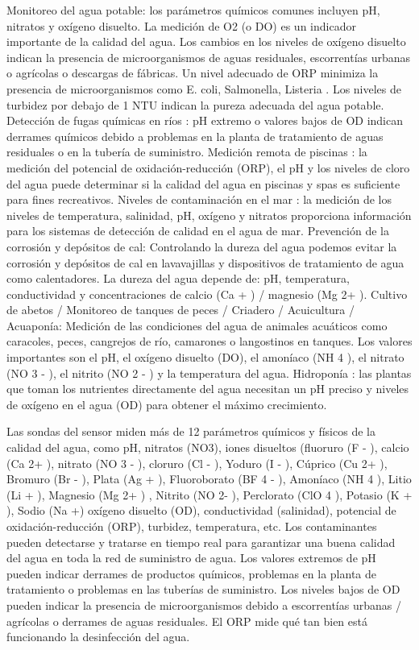 Monitoreo del agua potable: los parámetros químicos comunes incluyen pH, nitratos y oxígeno disuelto. 
La medición de O2 (o DO) es un indicador importante de la calidad del agua. 
Los cambios en los niveles de oxígeno disuelto indican la presencia de microorganismos de aguas residuales, escorrentías urbanas o agrícolas o descargas de fábricas. 
Un nivel adecuado de ORP minimiza la presencia de microorganismos como  E. coli, Salmonella, Listeria . 
Los niveles de turbidez por debajo de 1 NTU indican la pureza adecuada del agua potable.
Detección de fugas químicas en ríos : pH extremo o valores bajos de OD indican derrames químicos debido a problemas en la planta de tratamiento de aguas residuales o en la tubería de suministro.
Medición remota de piscinas : la medición del potencial de oxidación-reducción (ORP), el pH y los niveles de cloro del agua puede determinar si la calidad del agua en piscinas y spas es suficiente para fines recreativos.
Niveles de contaminación en el mar : la medición de los niveles de temperatura, salinidad, pH, oxígeno y nitratos proporciona información para los sistemas de detección de calidad en el agua de mar.
Prevención de la corrosión y depósitos de cal:  Controlando la dureza del agua podemos evitar la corrosión y depósitos de cal en lavavajillas y dispositivos de tratamiento de agua como calentadores. 
La dureza del agua depende de: pH, temperatura, conductividad y concentraciones de calcio (Ca + ) / magnesio (Mg 2+ ).
Cultivo de abetos / Monitoreo de tanques de peces / Criadero / Acuicultura / Acuaponía: Medición de las condiciones del agua de animales acuáticos como caracoles, peces, cangrejos de río, camarones o langostinos en tanques. 
Los valores importantes son el pH, el oxígeno disuelto (DO), el amoníaco (NH 4 ), el nitrato (NO 3 - ), el nitrito (NO 2 - ) y la temperatura del agua.
Hidroponía : las plantas que toman los nutrientes directamente del agua necesitan un pH preciso y niveles de oxígeno en el agua (OD) para obtener el máximo crecimiento.

Las sondas del sensor miden más de 12 parámetros químicos y físicos de la calidad del agua, como pH, nitratos (NO3), iones disueltos (fluoruro (F - ), calcio (Ca 2+ ), nitrato (NO 3 - ), cloruro (Cl - ), Yoduro (I - ), Cúprico (Cu 2+ ), Bromuro (Br - ), Plata (Ag + ), Fluoroborato (BF 4 - ), Amoníaco (NH 4 ), Litio (Li + ), Magnesio (Mg 2+ ) , Nitrito (NO 2- ), Perclorato (ClO 4 ), Potasio (K + ), Sodio (Na +) oxígeno disuelto (OD), conductividad (salinidad), potencial de oxidación-reducción (ORP), turbidez, temperatura, etc. Los contaminantes pueden detectarse y tratarse en tiempo real para garantizar una buena calidad del agua en toda la red de suministro de agua. Los valores extremos de pH pueden indicar derrames de productos químicos, problemas en la planta de tratamiento o problemas en las tuberías de suministro. Los niveles bajos de OD pueden indicar la presencia de microorganismos debido a escorrentías urbanas / agrícolas o derrames de aguas residuales. El ORP mide qué tan bien está funcionando la desinfección del agua.

